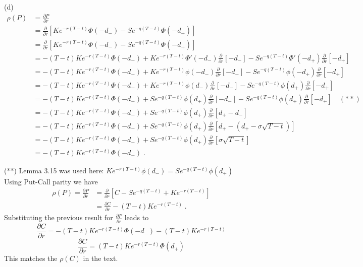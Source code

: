 \documentclass[11pt]{article}
\begin{document}
(d)
\begin{align*}
\rho(P) &= \frac{\partial P}{\partial r}\\ & =\frac{\partial}{\partial r} [Ke^{-r(T-t)}\Phi(-d_-)-Se^{-q(T-t)}\Phi(-d_+)]  \\ & = \frac{\partial}{\partial r} [Ke^{-r(T-t)}\Phi(-d_-)-Se^{-q(T-t)}\Phi(-d_+)]\\& = -(T-t)Ke^{-r(T-t)}\Phi(-d_-) + Ke^{-r(T-t)}\Phi'(-d_-)\frac{\partial}{\partial r} [-d_-] - Se^{-q(T-t)}\Phi'(-d_+)\frac{\partial}{\partial r} [-d_+] \\ & = -(T-t)Ke^{-r(T-t)}\Phi(-d_-) + Ke^{-r(T-t)}\phi(-d_-)\frac{\partial}{\partial r} [-d_-] - Se^{-q(T-t)}\phi(-d_+)\frac{\partial}{\partial r} [-d_+] \\ & = -(T-t)Ke^{-r(T-t)}\Phi(-d_-) + Ke^{-r(T-t)}\phi(d_-)\frac{\partial}{\partial r} [-d_-] - Se^{-q(T-t)}\phi(d_+)\frac{\partial}{\partial r} [-d_+]  \\ & = -(T-t)Ke^{-r(T-t)}\Phi(-d_-) + Se^{-q(T-t)}\phi(d_+) \frac{\partial}{\partial r} [-d_-] - Se^{-q(T-t)}\phi(d_+)\frac{\partial}{\partial r} [-d_+] \quad(**) \\ & = -(T-t)Ke^{-r(T-t)}\Phi(-d_-) + Se^{-q(T-t)}\phi(d_+) \frac{\partial}{\partial r} [d_+ - d_-] \\ & = -(T-t)Ke^{-r(T-t)}\Phi(-d_-) + Se^{-q(T-t)}\phi(d_+) \frac{\partial}{\partial r}[d_+ - (d_+ - \sigma\sqrt{T-t})] \\ & = -(T-t)Ke^{-r(T-t)}\Phi(-d_-) + Se^{-q(T-t)}\phi(d_+) \frac{\partial}{\partial r} [\sigma\sqrt{T-t}] \\ & = -(T-t)Ke^{-r(T-t)}\Phi(-d_-) \;.
\end{align*}

(**) Lemma 3.15 was used here: $Ke^{-r(T-t)} \phi(d_-) = Se^{-q(T-t)} \phi(d_+)$\\

Using Put-Call parity we have
\begin{align*}
\rho(P) = \frac{\partial P}{\partial r} &= \frac{\partial}{\partial r} [C - Se^{-q(T-t)} + Ke^{-r(T-t)}] \\ & = \frac{\partial C}{\partial r} - (T-t)Ke^{-r(T-t)} \;.
\end{align*}
Substituting the previous result for $\frac{\partial P}{\partial r}$ leads to 
$$ \frac{\partial C}{\partial r} = -(T-t)Ke^{-r(T-t)}\Phi(-d_-) - (T-t)Ke^{-r(T-t)}$$
$$ \frac{\partial C}{\partial r} = (T-t)Ke^{-r(T-t)}\Phi(d_+)$$
This matches the $\rho(C)$ in the text.
\end{document}
